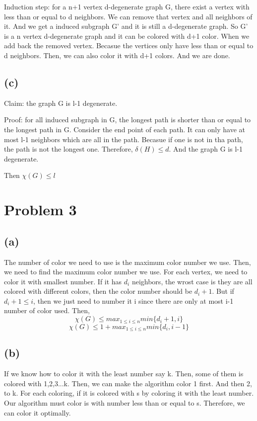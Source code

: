 \documentclass[11pt]{article}
\begin{document}
Induction step: for a n+1 vertex d-degenerate graph G, there exist a vertex with less than or equal to d neighbors. We can remove that vertex and all neighbors of it. And we get a induced subgraph G' and it is still a d-degenerate graph. So G' is a n vertex d-degenerate graph and it can be colored with d+1 color. When we add back the removed vertex. Becasue the vertices only have less than or equal to d neighbors. Then, we can also color it with d+1 colors. And we are done.

\subsection*{(c)}
Claim: the graph G is l-1 degenerate.

Proof: for all induced subgraph in G, the longest path is shorter than or equal to the longest path in G. Consider the end point of each path. It can only have at most l-1 neighbors which are all in the path. Becasue if one is not in tha path, the path is not the longest one. Therefore, $\delta(H) \le d $. And the graph G is l-1 degenerate.

Then $\chi (G) \le l$
\section{Problem 3}
\subsection*{(a)}

The number of color we need to use is the maximum color number we use. Then, we need to find the maximum color number we use. For each vertex, we need to color it with smallest number. If it has $d_i$ neighbors, the wrost case is they are all colored with different colors, then the color number should be $d_i+1$. But if $d_i+1\le i$, then we just need to number it i since there are only at most i-1 number of color used. Then, $$\chi (G) \le max_{1 \le i \le n} min\{d_i+1, i\}$$
$$\chi (G) \le 1+ max_{1 \le i \le n} min\{d_i, i-1\}$$

\subsection*{(b)}
If we know how to color it with the least number say k. Then, some of them is colored with 1,2,3...k. Then, we can make the algorithm color 1 first. And then 2, to k.
For each coloring, if it is colored with s by coloring it with the least number. Our algorithm must color is with number less than or equal to s. Therefore, we can color it optimally.
\end{document}

